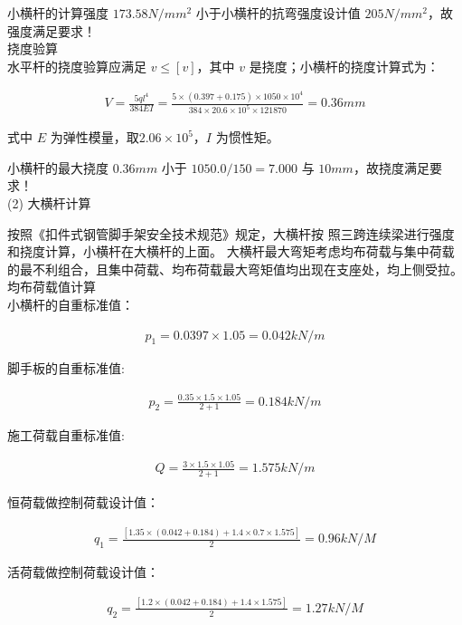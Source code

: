 小横杆的计算强度 $173.58N/mm^2$ 小于小横杆的抗弯强度设计值 $205N/mm^2$，故强度满足要求！\\

 挠度验算\\

水平杆的挠度验算应满足 $v\leq [v] $，其中 $v$ 是挠度；小横杆的挠度计算式为：

\begin{align}
    V=\frac{5ql^4}{384EI}=\frac{5\times (0.397+0.175)\times 1050\times 10^4}{384\times 20.6\times 10^5\times 121870}=0.36 mm
\end{align}

式中 $E$ 为弹性模量，取$2.06\times 10^5$，$I$ 为惯性矩。

小横杆的最大挠度 $0.36mm$ 小于 $1050.0/150=7.000$ 与 $10mm$，故挠度满足要求！ \\

(2) 大横杆计算

按照《扣件式钢管脚手架安全技术规范》规定，大横杆按
照三跨连续梁进行强度和挠度计算，小横杆在大横杆的上面。
大横杆最大弯矩考虑均布荷载与集中荷载的最不利组合，且集中荷载、均布荷载最大弯矩值均出现在支座处，均上侧受拉。\\

 均布荷载值计算\\

小横杆的自重标准值：

\begin{align}
    p_1=0.0397 \times 1.05=0.042 kN/m
\end{align}

脚手板的自重标准值:

\begin{align}
    p_2=\frac{0.35 \times 1.5\times 1.05}{2+1}=0.184 kN/m
\end{align}

施工荷载自重标准值:

\begin{align}
    Q=\frac{3 \times 1.5\times 1.05}{2+1}=1.575 kN/m
\end{align}

恒荷载做控制荷载设计值：

\begin{align}
    q_1=\frac{[1.35\times(0.042+0.184)+1.4\times 0.7\times 1.575]}{2}=0.96 kN/M
\end{align}

活荷载做控制荷载设计值：

\begin{align}
    q_2=\frac{[1.2\times(0.042+0.184)+1.4\times 1.575]}{2}=1.27 kN/M
\end{align}

